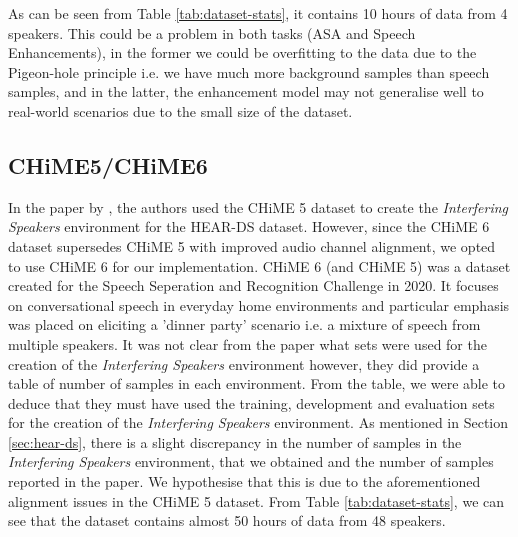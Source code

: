 \documentclass[logo,bsc,singlespacing,parskip,online]{infthesis}
\begin{document}
As can be seen from Table \ref{tab:dataset-stats}, it contains 10 hours of data from 4 speakers. This could be a problem in both tasks (ASA and Speech Enhancements), in the former
we could be overfitting to the data due to the Pigeon-hole principle i.e. we have much more background samples than speech samples, 
and in the latter, the enhancement model may not generalise well to real-world scenarios due to the small size of the dataset. 


\subsection{CHiME5/CHiME6}
In the paper by \citet{Huwel2020HearDS}, the authors used the CHiME 5 dataset to create the \textit{Interfering Speakers} environment for the HEAR-DS dataset.
However, since the CHiME 6 dataset supersedes CHiME 5 with improved audio channel alignment, we opted to use CHiME 6 for our implementation.
CHiME 6 (and CHiME 5) was a dataset created for the Speech Seperation and Recognition Challenge in 2020. It 
focuses on conversational speech in everyday home environments and particular emphasis was placed on 
eliciting a 'dinner party' scenario i.e. a mixture of speech from multiple speakers. It was not 
clear from the paper what sets were used for the creation of the \textit{Interfering Speakers} environment 
however, they did provide a table of number of samples in each environment. From the table, we 
were able to deduce that they must have used the training, development and evaluation sets for the creation of the \textit{Interfering Speakers} environment.
As mentioned in Section \ref{sec:hear-ds}, there is a slight discrepancy in the number of samples in the \textit{Interfering Speakers} environment, 
that we obtained and the number of samples reported in the paper. We hypothesise that this is due to the aforementioned alignment issues in the CHiME 5 dataset.
From Table \ref{tab:dataset-stats}, we can see that the dataset contains almost 50 hours of data from 48 speakers. 
\end{document}
